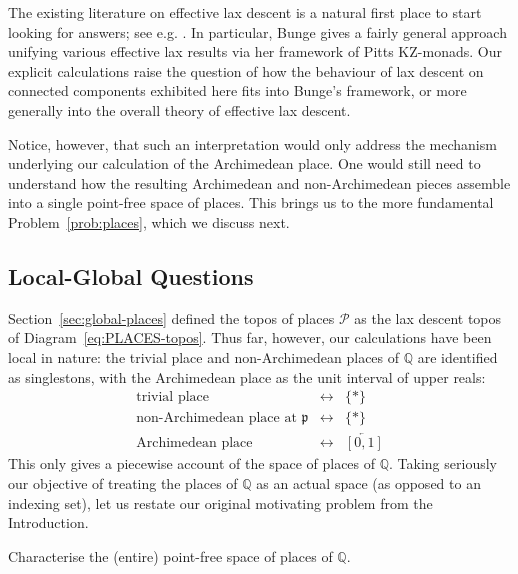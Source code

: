 \documentclass[a4paper, 11pt,reqno]{amsart}
\newcommand{\calP}{\mathcal{P}}
\newcommand{\frap}{\mathfrak{p}}
\newcommand{\Q}{\mathbb{Q}}
\begin{document}
\begin{discussion} The existing literature on effective lax descent is a natural first place to start looking for answers; see e.g. \cite{Pitts,MoVer00,BungePittsLax}. In particular, Bunge \cite{BungePittsLax} gives a fairly general approach unifying various effective lax results via her framework of Pitts KZ-monads. Our explicit calculations raise the question of how the behaviour of lax
descent on connected components exhibited here fits into Bunge's framework, or more generally into the overall theory of effective lax descent.
	
Notice, however, that such an interpretation would only address the mechanism underlying our calculation of the Archimedean place. One would still need to understand how the resulting Archimedean and non-Archimedean pieces assemble into a single point-free space of places. This brings us to the more fundamental Problem~\ref{prob:places}, which we discuss next.
\end{discussion}

\subsection{Local-Global Questions} Section~\ref{sec:global-places} defined the topos of places $\calP$ as the lax descent topos of Diagram~\eqref{eq:PLACES-topos}. Thus far, however, our calculations have been local in nature: the trivial place and non-Archimedean places of $\Q$ are identified as singlestons, with the Archimedean place as the unit interval of upper reals: 
\[
\begin{array}{rcl}
\text{trivial place} &\longleftrightarrow& \{*\}\\
\text{non-Archimedean place at }\frap &\longleftrightarrow& \{*\}\\
\text{Archimedean place} &\longleftrightarrow& \overleftarrow{[0,1]} 
\end{array}
\]
This only gives a piecewise account of the space of places of $\Q$. Taking seriously our objective of treating the places of $\Q$ as an actual space (as opposed to an indexing set), let us restate our original motivating problem from the Introduction.

\begin{problem}\label{prob:places} Characterise the (entire) point-free space of places of $\Q$. %
\end{problem}
\end{document}
